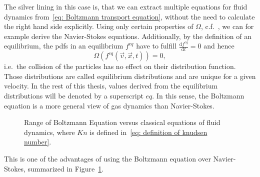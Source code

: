 The silver lining in this case is, that we can extract multiple equations for fluid dynamics from~\eqref{eq: Boltzmann transport equation}, without the need to calculate the right hand side explicitly.
Using only certain properties of $\Omega$, c.f.~\cite[Pages 26 ff.]{harris2004introduction}, we can for example derive the Navier-Stokes equations.
Additionally, by the definition of an equilibrium, the \glspl{pdf} in an equilibrium $f^{eq}$ have to fulfill $\frac{\text{d}f^{eq}}{\text{d}t}=0$ and hence
\begin{equation}
  \Omega(f^{eq}(\vec{v},\vec{x},t)) = 0,
\end{equation}
i.e.\ the collision of the particles has no effect on their distribution function.
Those distributions are called equilibrium distributions and are unique for a given velocity.
In the rest of this thesis, values derived from the equilibrium distributions will be denoted by a superscript $eq$.
In this sense, the Boltzmann equation is a more general view of gas dynamics than Navier-Stokes.
\begin{figure}
\centering
{}
\caption{Range of Boltzmann Equation versus classical equations of fluid dynamics, where $Kn$ is defined in~\eqref{eq: definition of knudsen number}.}
\label{fig: boltzmann vs navier stokes}
\end{figure}

This is one of the advantages of using the Boltzmann equation over Navier-Stokes, summarized in Figure~\ref{fig: boltzmann vs navier stokes}.

